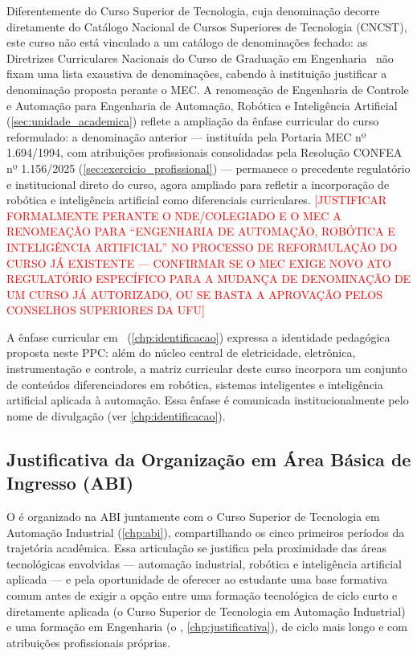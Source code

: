 Diferentemente do Curso Superior de Tecnologia, cuja denominação decorre diretamente do Catálogo Nacional de Cursos Superiores de Tecnologia (CNCST), este curso não está vinculado a um catálogo de denominações fechado: as Diretrizes Curriculares Nacionais do Curso de Graduação em Engenharia~\cite{cne_ces_2_2019,cne_ces_1_2021} não fixam uma lista exaustiva de denominações, cabendo à instituição justificar a denominação proposta perante o MEC. A renomeação de Engenharia de Controle e Automação para Engenharia de Automação, Robótica e Inteligência Artificial (\autoref{sec:unidade_academica}) reflete a ampliação da ênfase curricular do curso reformulado: a denominação anterior — instituída pela Portaria MEC nº 1.694/1994, com atribuições profissionais consolidadas pela Resolução CONFEA nº 1.156/2025 (\autoref{sec:exercicio_profissional}) — permanece o precedente regulatório e institucional direto do curso, agora ampliado para refletir a incorporação de robótica e inteligência artificial como diferenciais curriculares. \textcolor{red}{[JUSTIFICAR FORMALMENTE PERANTE O NDE/COLEGIADO E O MEC A RENOMEAÇÃO PARA ``ENGENHARIA DE AUTOMAÇÃO, ROBÓTICA E INTELIGÊNCIA ARTIFICIAL'' NO PROCESSO DE REFORMULAÇÃO DO CURSO JÁ EXISTENTE — CONFIRMAR SE O MEC EXIGE NOVO ATO REGULATÓRIO ESPECÍFICO PARA A MUDANÇA DE DENOMINAÇÃO DE UM CURSO JÁ AUTORIZADO, OU SE BASTA A APROVAÇÃO PELOS CONSELHOS SUPERIORES DA UFU]}

A ênfase curricular em \ppcenfasecurricular\ (\autoref{chp:identificacao}) expressa a identidade pedagógica proposta neste PPC: além do núcleo central de eletricidade, eletrônica, instrumentação e controle, a matriz curricular deste curso incorpora um conjunto de conteúdos diferenciadores em robótica, sistemas inteligentes e inteligência artificial aplicada à automação. Essa ênfase é comunicada institucionalmente pelo nome de divulgação \ppccursomercadologico (ver \autoref{chp:identificacao}).

\subsection{Justificativa da Organização em Área Básica de Ingresso (ABI)}

O \ppccurso é organizado na ABI juntamente com o Curso Superior de Tecnologia em Automação Industrial (\autoref{chp:abi}), compartilhando os cinco primeiros períodos da trajetória acadêmica. Essa articulação se justifica pela proximidade das áreas tecnológicas envolvidas — automação industrial, robótica e inteligência artificial aplicada — e pela oportunidade de oferecer ao estudante uma base formativa comum antes de exigir a opção entre uma formação tecnológica de ciclo curto e diretamente aplicada (o Curso Superior de Tecnologia em Automação Industrial) e uma formação em Engenharia (o \ppccurso, \autoref{chp:justificativa}), de ciclo mais longo e com atribuições profissionais próprias.

